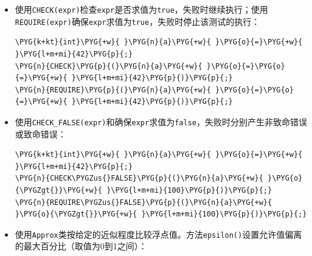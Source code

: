 \begin{itemize}
\item 使用\texttt{CHECK(\allowbreak{}expr)}检查\texttt{expr}是否求值为\texttt{true}，失败时继续执行；使用\texttt{REQUIRE(\allowbreak{}expr)}确保\texttt{expr}求值为\texttt{true}，失败时停止该测试的执行：



\begin{codeblockbg}
\begin{Verbatim}[commandchars=\\\{\},breaklines=true,breakanywhere=true,fontsize=\codefont,xleftmargin=17bp]
\PYG{k+kt}{int}\PYG{+w}{ }\PYG{n}{a}\PYG{+w}{ }\PYG{o}{=}\PYG{+w}{ }\PYG{l+m+mi}{42}\PYG{p}{;}
\PYG{n}{CHECK}\PYG{p}{(}\PYG{n}{a}\PYG{+w}{ }\PYG{o}{=}\PYG{o}{=}\PYG{+w}{ }\PYG{l+m+mi}{42}\PYG{p}{)}\PYG{p}{;}
\PYG{n}{REQUIRE}\PYG{p}{(}\PYG{n}{a}\PYG{+w}{ }\PYG{o}{=}\PYG{o}{=}\PYG{+w}{ }\PYG{l+m+mi}{42}\PYG{p}{)}\PYG{p}{;}
\end{Verbatim}
\end{codeblockbg}



\item 使用\texttt{CHECK\_\allowbreak{}FALSE(\allowbreak{}expr)}和确保\texttt{expr}求值为\texttt{false}，失败时分别产生非致命错误或致命错误：



\begin{codeblockbg}
\begin{Verbatim}[commandchars=\\\{\},breaklines=true,breakanywhere=true,fontsize=\codefont,xleftmargin=17bp]
\PYG{k+kt}{int}\PYG{+w}{ }\PYG{n}{a}\PYG{+w}{ }\PYG{o}{=}\PYG{+w}{ }\PYG{l+m+mi}{42}\PYG{p}{;}
\PYG{n}{CHECK\PYGZus{}FALSE}\PYG{p}{(}\PYG{n}{a}\PYG{+w}{ }\PYG{o}{\PYGZgt{}}\PYG{+w}{ }\PYG{l+m+mi}{100}\PYG{p}{)}\PYG{p}{;}
\PYG{n}{REQUIRE\PYGZus{}FALSE}\PYG{p}{(}\PYG{n}{a}\PYG{+w}{ }\PYG{o}{\PYGZgt{}}\PYG{+w}{ }\PYG{l+m+mi}{100}\PYG{p}{)}\PYG{p}{;}
\end{Verbatim}
\end{codeblockbg}



\item 使用\texttt{Approx}类按给定的近似程度比较浮点值。方法\texttt{epsilon()}设置允许值偏离的最大百分比（取值为0到1之间）：




\end{itemize}
